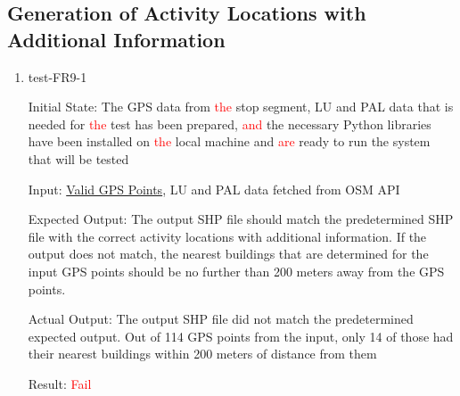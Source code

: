 \documentclass[12pt, titlepage]{article}
\begin{document}
\subsection{Generation of Activity Locations with Additional Information}
\begin{enumerate}
    \item {test-FR9-1}\label{test-FR9-1}
    
    Initial State: The GPS data from \textcolor{red}{the} stop segment, LU and PAL data that is needed for \textcolor{red}{the} test has been prepared, \textcolor{red}{and} the necessary Python libraries have been installed on \textcolor{red}{the} local machine and \textcolor{red}{are} ready to run the system that will be tested
    
    Input: \href{https://github.com/paezha/PyERT-BLACK/blob/rev0-test/quarto-example/data/sample-gps/sample-gps-1.csv}{Valid GPS Points}, LU and PAL data fetched from OSM API
    
    Expected Output: The output SHP file should match the predetermined SHP file with the correct activity locations with additional information. If the output does not match, the nearest buildings that are determined for the input GPS points should be no further than 200 meters away from the GPS points.
    
    Actual Output: The output SHP file did not match the predetermined expected output. Out of 114 GPS points from the input, only 14 of those had their nearest buildings within 200 meters of distance from them
    
    Result: \textcolor{red}{Fail}
\end{enumerate}
\end{document}
